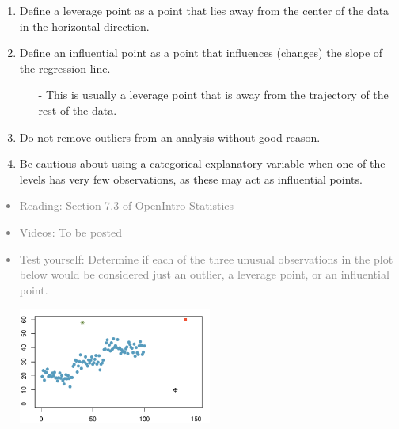\documentclass[11pt]{article}
\newcommand{\gray}[1]{\textcolor{gray}{#1}}
\begin{document}
%

\vspace{0.48cm}

%

\begin{enumerate}[resume]
\renewcommand\labelenumi{\textcolor{light}{\textbf{LO \theenumi.}}}

\item Define a leverage point as a point that lies away from the center of the data in the horizontal direction.

\item Define an influential point as a point that influences (changes) the slope of the regression line.
\begin{itemize}
\item[-] This is usually a leverage point that is away from the trajectory of the rest of the data.
\end{itemize}

\item Do not remove outliers from an analysis without good reason.

\item Be cautious about using a categorical explanatory variable when one of the levels has very few observations, as these may act as influential points.

\end{enumerate}

\gray{
{\it
\vspace{-0.55cm}
\begin{itemize}
\renewcommand{\labelitemi}{{\textcolor{dark}{$\ast$}}}
\item Reading: Section 7.3 of OpenIntro Statistics
\item Videos: To be posted 
\item Test yourself: Determine if each of the three unusual observations in the plot below would be considered just an outlier, a leverage point, or an influential point.
\begin{center}
\includegraphics[width=0.5\textwidth]{figures/outliers}
\end{center}
\end{itemize}
}}
\end{document}
